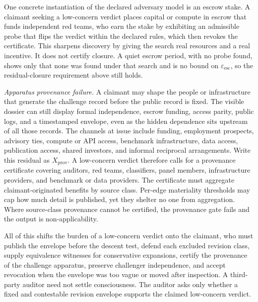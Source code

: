 \documentclass[11pt]{article}
\begin{document}
One concrete instantiation of the declared adversary model is an escrow stake. A
claimant seeking a low-concern verdict places capital or compute in escrow that
funds independent red teams, who earn the stake by exhibiting an admissible probe
that flips the verdict within the declared rules, which then revokes the
certificate. This sharpens discovery by giving the search real resources and a
real incentive. It does not certify closure. A quiet escrow period, with no
probe found, shows only that none was found under that search and is no bound on
$\varepsilon_{\mathrm{esc}}$, so the residual-closure requirement above still
holds.

\emph{Apparatus provenance failure.} A claimant may shape the people or
infrastructure that generate the challenge record before the public record is
fixed. The visible dossier can still display formal independence, escrow
funding, access parity, public logs, and a timestamped envelope, even as the
hidden dependence sits upstream of all those records. The channels at issue
include funding, employment prospects, advisory ties, compute or API access,
benchmark infrastructure, data access, publication access, shared investors, and
informal reciprocal arrangements. Write this residual as $X_{\mathrm{prov}}$. A
low-concern verdict therefore calls for a provenance certificate covering
auditors, red teams, classifiers, panel members, infrastructure providers, and
benchmark or data providers. The certificate must aggregate claimant-originated
benefits by source class. Per-edge materiality thresholds may cap how much
detail is published, yet they shelter no one from aggregation. Where
source-class provenance cannot be certified, the provenance gate fails and the
output is non-applicability.

All of this shifts the burden of a low-concern verdict onto the claimant, who
must publish the envelope before the descent test, defend each excluded revision
class, supply equivalence witnesses for conservative expansions, certify the
provenance of the challenge apparatus, preserve challenger independence, and
accept revocation when the envelope was too vague or moved after inspection. A
third-party auditor need not settle consciousness. The auditor asks only whether
a fixed and contestable revision envelope supports the claimed low-concern
verdict.
\end{document}

